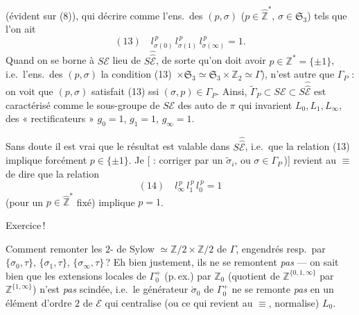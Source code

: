 \documentclass[11pt,a4paper]{article}
\begin{document}
(évident sur (8)), qui   décrire
comme l'ens.\ des $(p, \sigma)$ ($p \in \hat{\mathbb{Z}}^{*}$, $\sigma \in
\mathfrak{S}_3$) tels que l'on ait
\[
(13)\quad l_{\sigma(0)}^{\,p}\, l_{\sigma(1)}^{\,p}\, l_{\sigma(\infty)}^{\,p} = 1 .
\]
Quand on se borne à $S\mathcal{E}$ \ill{} lieu de $S\hat{\hat{\mathcal{E}}}$, de sorte
qu'on doit avoir $p \in \mathbb{Z}^{*} = \{\pm 1\}$,  i.e.\ l'ens.\ des $(p, \sigma)$  
la condition (13)  \struck{\ill{}}\,$\times \mathfrak{S}_3
\simeq \mathfrak{S}_3 \times \mathbb{Z}_2 \simeq \Gamma$), 
n'est autre que $\Gamma_P$ : on voit que $(p, \sigma)$ satisfait (13) ssi
$(\sigma, p) \in \Gamma_P$. Ainsi, $\tilde\Gamma_P \subset S\mathcal{E} \subset
S\hat{\hat{\mathcal{E}}}$ est caractérisé comme le sous-groupe de $S\mathcal{E}$ des
auto de $\pi$ \struck{\ill{}} qui invarient $L_0, L_1,
L_\infty$,  des « rectificateurs »
 $g_0 = 1$, $g_1 = 1$, $g_\infty = 1$.

Sans doute il est vrai que le  résultat est valable dans
$S\hat{\hat{\mathcal{E}}}$, i.e.\ que la relation (13) implique forcément $p \in
\{\pm 1\}$. Je   
[ : corriger par un $\tilde\sigma_i$, ou $\sigma \in
\Gamma_P$\,)] revient au $\equiv$ de dire que la relation
\[
(14)\quad l_\infty^{\,p}\, l_1^{\,p}\, l_0^{\,p} = 1
\]
(pour un $p \in \hat{\mathbb{Z}}^{*}$ fixé) implique $p = 1$.

Exercice\,!


Comment remonter les $2$- de Sylow $\simeq \mathbb{Z}/2
\times \mathbb{Z}/2$ de $\Gamma$, engendrés resp.\ par $\{\sigma_0, \tau\}$,
$\{\sigma_1, \tau\}$, $\{\sigma_\infty, \tau\}$\,? Eh bien justement, ils
ne se remontent \emph{pas} --- on sait bien que les extensions locales de
$\Gamma^{+}_0$ (p.\,ex.) par $\mathbb{Z}_0$ (quotient de
$\mathbb{Z}^{\{0,1,\infty\}}$ par $\mathbb{Z}^{\{1,\infty\}}$) n'est
\emph{pas} scindée, i.e.\ le générateur $\dot\sigma_0$ de $\Gamma^{+}_0$ ne
se remonte \emph{pas} en un élément d'ordre $2$ de $\mathcal{E}$ qui centralise
(ou ce qui revient au $\equiv$, normalise) $L_0$.
\end{document}
